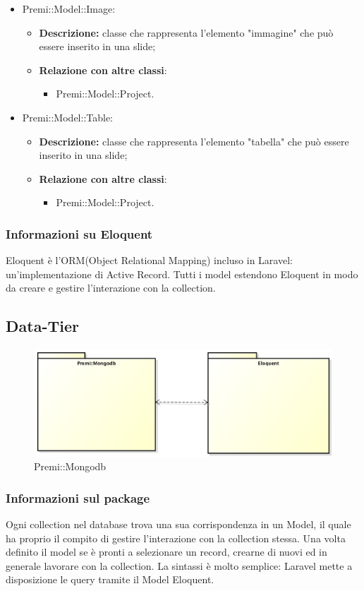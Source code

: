 \begin{itemize}
		\item Premi::Model::Image:
		\begin{itemize}
			\item \textbf{Descrizione:} classe che rappresenta l'elemento "immagine" che può essere inserito in una \gls{slide};
			\item \textbf{Relazione con altre classi}:
			\begin{itemize}
				\item Premi::Model::Project.
			\end{itemize}
		\end{itemize}
		
		\item Premi::Model::Table:
		\begin{itemize}
			\item \textbf{Descrizione:} classe che rappresenta l'elemento "tabella" che può essere inserito in una \gls{slide};
			\item \textbf{Relazione con altre classi}:
			\begin{itemize}
				\item Premi::Model::Project.
			\end{itemize}
		\end{itemize}
	\end{itemize}
	
\subsubsection*{Informazioni su Eloquent}
Eloquent è l'ORM(Object Relational Mapping) incluso in Laravel: un'implementazione di Active Record. Tutti i model estendono  Eloquent in modo da creare e gestire l'interazione con la collection.

\subsection{Data-Tier}
\begin{figure}[h]
\centering
\includegraphics[width=0.7\linewidth]{img/premi_mongodb}
\caption[Premi::Mongodb]{Premi::Mongodb}
\label{fig:premi_mongodb}
\end{figure}
\subsubsection*{Informazioni sul package}
Ogni collection nel database trova una sua corrispondenza in un Model, il quale ha proprio il compito di gestire l'interazione con la collection stessa. Una volta definito il model se è pronti a selezionare un record, crearne di nuovi ed in generale lavorare con la collection. La sintassi è molto semplice: Laravel mette a disposizione le query tramite il Model Eloquent.
